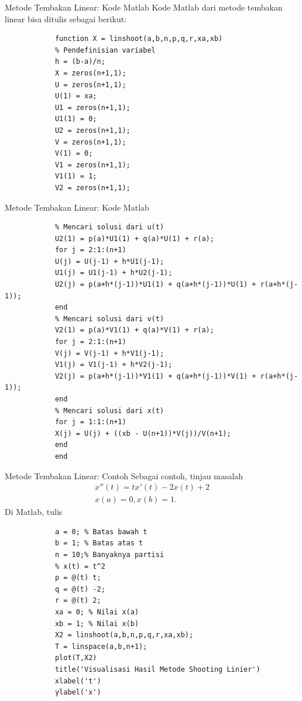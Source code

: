 \documentclass[xcolor={dvipsnames}, 9pt]{beamer}
\begin{document}
    \begin{frame}[fragile]{Metode Tembakan Linear: Kode Matlab}
    	Kode Matlab dari metode tembakan linear bisa ditulis sebagai berikut:
		\begin{verbatim}
			function X = linshoot(a,b,n,p,q,r,xa,xb)
			% Pendefinisian variabel
			h = (b-a)/n;
			X = zeros(n+1,1);
			U = zeros(n+1,1);
			U(1) = xa;
			U1 = zeros(n+1,1);
			U1(1) = 0;
			U2 = zeros(n+1,1);
			V = zeros(n+1,1);
			V(1) = 0;
			V1 = zeros(n+1,1);
			V1(1) = 1;
			V2 = zeros(n+1,1);
		\end{verbatim}
	\end{frame}
	\begin{frame}[fragile]{Metode Tembakan Linear: Kode Matlab}
		\begin{verbatim}
			% Mencari solusi dari u(t)
			U2(1) = p(a)*U1(1) + q(a)*U(1) + r(a);
			for j = 2:1:(n+1)
			U(j) = U(j-1) + h*U1(j-1);
			U1(j) = U1(j-1) + h*U2(j-1);
			U2(j) = p(a+h*(j-1))*U1(1) + q(a+h*(j-1))*U(1) + r(a+h*(j-1));
			end
			% Mencari solusi dari v(t)
			V2(1) = p(a)*V1(1) + q(a)*V(1) + r(a);
			for j = 2:1:(n+1)
			V(j) = V(j-1) + h*V1(j-1);
			V1(j) = V1(j-1) + h*V2(j-1);
			V2(j) = p(a+h*(j-1))*V1(1) + q(a+h*(j-1))*V(1) + r(a+h*(j-1));
			end
			% Mencari solusi dari x(t)
			for j = 1:1:(n+1)
			X(j) = U(j) + ((xb - U(n+1))*V(j))/V(n+1);
			end
			end
		\end{verbatim}
	\end{frame}
    \begin{frame}[fragile]{Metode Tembakan Linear: Contoh}
    	Sebagai contoh, tinjau masalah
    	\begin{align*}
    		x''(t) = tx'(t) - 2x(t) + 2 \\
    		x(a) = 0, x(b) = 1.
    	\end{align*}
    	Di Matlab, tulis
    	\begin{verbatim}
    		a = 0; % Batas bawah t
    		b = 1; % Batas atas t
    		n = 10;% Banyaknya partisi
    		% x(t) = t^2
    		p = @(t) t;
    		q = @(t) -2;
    		r = @(t) 2;
    		xa = 0; % Nilai x(a)
    		xb = 1; % Nilai x(b)
    		X2 = linshoot(a,b,n,p,q,r,xa,xb);
    		T = linspace(a,b,n+1);
    		plot(T,X2)
    		title('Visualisasi Hasil Metode Shooting Linier')
    		xlabel('t')
    		ylabel('x')
    	\end{verbatim}
    \end{frame}
\end{document}
